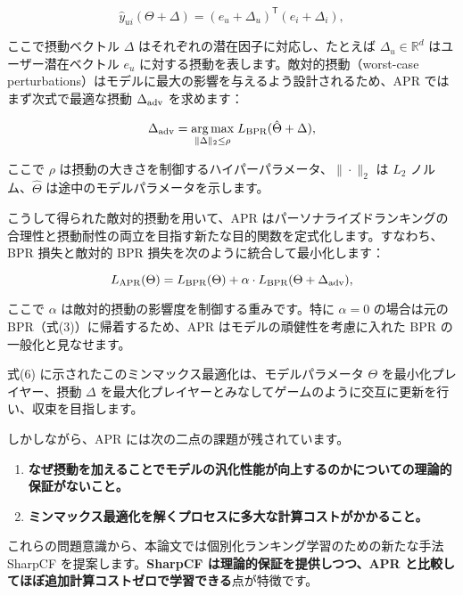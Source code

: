 \documentclass[11pt,a4paper]{article}
\begin{document}
\begin{equation}
\hat{y}_{ui}(\Theta + \Delta) = (e_u + \Delta_u)^\mathsf{T}(e_i + \Delta_i),
\end{equation}

ここで摂動ベクトル $\Delta$ はそれぞれの潜在因子に対応し、たとえば $\Delta_u \in \mathbb{R}^d$ はユーザー潜在ベクトル $e_u$ に対する摂動を表します。敵対的摂動（worst-case perturbations）はモデルに最大の影響を与えるよう設計されるため、APR ではまず次式で最適な摂動 $\Delta_{\rm adv}$ を求めます：

\begin{equation}
\Delta_{\rm adv} = \underset{\|\Delta\|_2 \le \rho}{\arg\max}\; L_{\rm BPR}(\hat\Theta + \Delta),
\end{equation}

ここで $\rho$ は摂動の大きさを制御するハイパーパラメータ、$\|\cdot\|_2$ は $L_2$ ノルム、$\hat\Theta$ は途中のモデルパラメータを示します。

こうして得られた敵対的摂動を用いて、APR はパーソナライズドランキングの合理性と摂動耐性の両立を目指す新たな目的関数を定式化します。すなわち、BPR 損失と敵対的 BPR 損失を次のように統合して最小化します：

\begin{equation}
L_{\rm APR}(\Theta) = L_{\rm BPR}(\Theta) + \alpha \cdot L_{\rm BPR}(\Theta + \Delta_{\rm adv}),
\end{equation}

ここで $\alpha$ は敵対的摂動の影響度を制御する重みです。特に $\alpha=0$ の場合は元の BPR（式(3)）に帰着するため、APR はモデルの頑健性を考慮に入れた BPR の一般化と見なせます。

式(6) に示されたこのミンマックス最適化は、モデルパラメータ $\Theta$ を最小化プレイヤー、摂動 $\Delta$ を最大化プレイヤーとみなしてゲームのように交互に更新を行い、収束を目指します。

しかしながら、APR には次の二点の課題が残されています。

\begin{enumerate}
    \item \textbf{なぜ摂動を加えることでモデルの汎化性能が向上するのかについての理論的保証がないこと。}
    \item \textbf{ミンマックス最適化を解くプロセスに多大な計算コストがかかること。}
\end{enumerate}

これらの問題意識から、本論文では個別化ランキング学習のための新たな手法 SharpCF を提案します。\textbf{SharpCF は理論的保証を提供しつつ、APR と比較してほぼ追加計算コストゼロで学習できる}点が特徴です。
\end{document}
